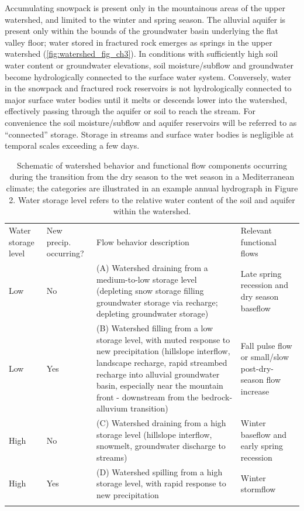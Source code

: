 \documentclass[hess, manuscript]{copernicus}
\begin{document}
Accumulating snowpack is present only in the mountainous areas of the
upper watershed, and limited to the winter and spring season. The
alluvial aquifer is present only within the bounds of the groundwater
basin underlying the flat valley floor; water stored in fractured rock
emerges as springs in the upper watershed \citep{Mack1958}
(\autoref{fig:watershed_fig_ch3}). In conditions with sufficiently high
soil water content or groundwater elevations, soil moisture/subflow and
groundwater become hydrologically connected to the surface water system.
Conversely, water in the snowpack and fractured rock reservoirs is not
hydrologically connected to major surface water bodies until it melts or
descends lower into the watershed, effectively passing through the
aquifer or soil to reach the stream. For convenience the soil
moisture/subflow and aquifer reservoirs will be referred to as
``connected'' storage. Storage in streams and surface water bodies is
negligible at temporal scales exceeding a few days.

\begin{table}[t]
\caption{Schematic of watershed behavior and functional flow components occurring during the transition from the dry season to the wet season in a Mediterranean climate; the categories are illustrated in an example annual hydrograph in Figure 2. Water storage level refers to the relative water content of the soil and aquifer within the watershed.}
\label{tab:watershed_modes_tab}
\begin{tabular}{p{1.8cm} p{1.6cm} p{6.0cm} p{3.8cm}}
\tophline
Water storage level & New precip. occurring? & Flow behavior description & Relevant functional flows \\
\middlehline
 Low & No & (A) Watershed draining from a medium-to-low storage level (depleting snow storage filling groundwater storage via recharge; depleting groundwater storage) & Late spring recession and dry season baseflow \\ 
 \middlehline
Low & Yes & (B) Watershed filling from a low storage level, with muted response to new precipitation (hillslope interflow, landscape recharge, rapid streambed recharge into alluvial groundwater basin, especially near the mountain front - downstream from the bedrock-alluvium transition) & Fall pulse flow or small/slow post-dry-season flow increase \\
\middlehline
High & No & (C) Watershed draining from a high storage level (hillslope interflow, snowmelt, groundwater discharge to streams) & Winter baseflow and early spring recession \\
\middlehline
High & Yes & (D) Watershed spilling from a high storage level, with rapid response to new precipitation & Winter stormflow\\
\bottomhline
\end{tabular}
\belowtable{}
\end{table}
\end{document}
